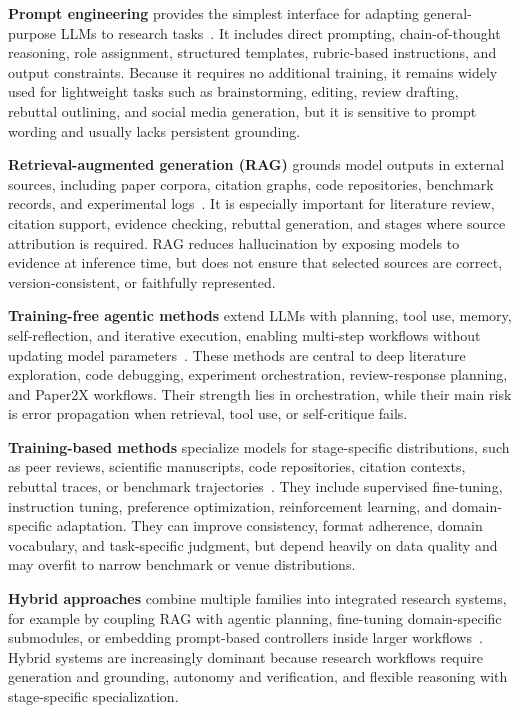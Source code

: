 \textbf{Prompt engineering} provides the simplest interface for adapting general-purpose LLMs to research tasks~\cite{wei2022chain,yao2023react}. It includes direct prompting, chain-of-thought reasoning, role assignment, structured templates, rubric-based instructions, and output constraints. Because it requires no additional training, it remains widely used for lightweight tasks such as brainstorming, editing, review drafting, rebuttal outlining, and social media generation, but it is sensitive to prompt wording and usually lacks persistent grounding.

\textbf{Retrieval-augmented generation (RAG)} grounds model outputs in external sources, including paper corpora, citation graphs, code repositories, benchmark records, and experimental logs~\cite{lewis2020retrieval}. It is especially important for literature review, citation support, evidence checking, rebuttal generation, and stages where source attribution is required. RAG reduces hallucination by exposing models to evidence at inference time, but does not ensure that selected sources are correct, version-consistent, or faithfully represented.

\textbf{Training-free agentic methods} extend LLMs with planning, tool use, memory, self-reflection, and iterative execution, enabling multi-step workflows without updating model parameters~\cite{yao2023react,schick2023toolformer,shinn2023reflexion}. These methods are central to deep literature exploration, code debugging, experiment orchestration, review-response planning, and Paper2X workflows. Their strength lies in orchestration, while their main risk is error propagation when retrieval, tool use, or self-critique fails.

\textbf{Training-based methods} specialize models for stage-specific distributions, such as peer reviews, scientific manuscripts, code repositories, citation contexts, rebuttal traces, or benchmark trajectories~\cite{ouyang2022training,wang2023selfinstruct}. They include supervised fine-tuning, instruction tuning, preference optimization, reinforcement learning, and domain-specific adaptation. They can improve consistency, format adherence, domain vocabulary, and task-specific judgment, but depend heavily on data quality and may overfit to narrow benchmark or venue distributions.

\textbf{Hybrid approaches} combine multiple families into integrated research systems, for example by coupling RAG with agentic planning, fine-tuning domain-specific submodules, or embedding prompt-based controllers inside larger workflows~\cite{lu2024aiscientist,lala2023paperqa,shao2024storm,openscholar2025}. Hybrid systems are increasingly dominant because research workflows require generation and grounding, autonomy and verification, and flexible reasoning with stage-specific specialization.

